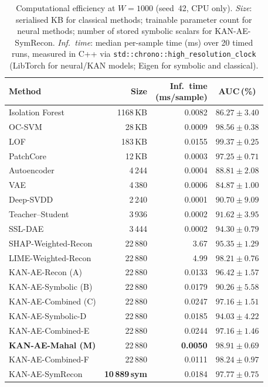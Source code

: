 \documentclass[conference]{IEEEtran}
\begin{document}
\begin{table}[t]
\centering
\caption{Computational efficiency at $W{=}1000$ (seed~42, CPU only).
  \emph{Size}: serialised KB for classical methods; trainable parameter
  count for neural methods; number of stored symbolic scalars for
  KAN-AE-SymRecon.
  \emph{Inf.\ time}: median per-sample time (ms) over 20 timed runs,
  measured in C++ via \texttt{std::chrono::high\_resolution\_clock}
  (LibTorch for neural/KAN models; Eigen for symbolic and classical).}
\label{tab:efficiency}
\small
\setlength{\tabcolsep}{3pt}
\begin{tabular}{lrrc}
\toprule
Method & Size & \shortstack{Inf.\ time\\(ms/sample)} & AUC\,(\%) \\
\midrule
Isolation Forest    & 1168\,KB & 0.0082 & $86.27{\pm}3.40$ \\
OC-SVM              &   28\,KB & 0.0009 & $98.56{\pm}0.38$ \\
LOF                 &  183\,KB & 0.0155 & $99.37{\pm}0.25$ \\
PatchCore           &   12\,KB & 0.0003 & $97.25{\pm}0.71$ \\
\midrule
Autoencoder         &  4\,244 & 0.0004 & $88.81{\pm}2.08$ \\
VAE                 &  4\,380 & 0.0006 & $84.87{\pm}1.00$ \\
Deep-SVDD           &  2\,240 & 0.0001 & $90.70{\pm}9.09$ \\
Teacher--Student    &  3\,936 & 0.0002 & $91.62{\pm}3.95$ \\
SSL-DAE             &  3\,444 & 0.0002 & $94.30{\pm}0.79$ \\
\midrule
SHAP-Weighted-Recon & 22\,880 & 3.67   & $95.35{\pm}1.29$ \\
LIME-Weighted-Recon & 22\,880 & 4.99   & $98.21{\pm}0.76$ \\
\midrule
KAN-AE-Recon (A)    & 22\,880 & 0.0133 & $96.42{\pm}1.57$ \\
KAN-AE-Symbolic (B) & 22\,880 & 0.0179 & $90.26{\pm}5.58$ \\
KAN-AE-Combined (C) & 22\,880 & 0.0247 & $97.16{\pm}1.51$ \\
KAN-AE-Symbolic-D   & 22\,880 & 0.0185 & $94.03{\pm}4.22$ \\
KAN-AE-Combined-E   & 22\,880 & 0.0244 & $97.16{\pm}1.46$ \\
\textbf{KAN-AE-Mahal (M)}  & 22\,880 & \textbf{0.0050} & $\mathbf{98.91{\pm}0.69}$ \\
KAN-AE-Combined-F   & 22\,880 & 0.0111 & $98.24{\pm}0.97$ \\
KAN-AE-SymRecon     & \textbf{10\,889\,sym} & 0.0184 & $97.77{\pm}0.75$ \\
\bottomrule
\end{tabular}
\end{table}
\end{document}
